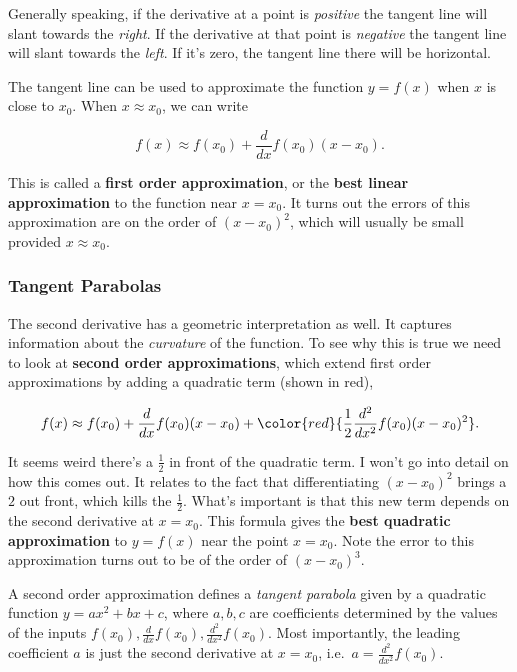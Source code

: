 \documentclass[
  letterpaper,
  DIV=11,
  numbers=noendperiod]{scrreprt}
\begin{document}
Generally speaking, if the derivative at a point is \emph{positive} the
tangent line will slant towards the \emph{right}. If the derivative at
that point is \emph{negative} the tangent line will slant towards the
\emph{left}. If it's zero, the tangent line there will be horizontal.

The tangent line can be used to approximate the function \(y=f(x)\) when
\(x\) is close to \(x_0\). When \(x \approx x_0\), we can write

\[f(x) \approx f(x_0) + \frac{d}{dx}f(x_0)(x - x_0).\]

This is called a \textbf{first order approximation}, or the \textbf{best
linear approximation} to the function near \(x=x_0\). It turns out the
errors of this approximation are on the order of \((x-x_0)^2\), which
will usually be small provided \(x \approx x_0\).

\hypertarget{tangent-parabolas}{%
\subsubsection{Tangent Parabolas}\label{tangent-parabolas}}

The second derivative has a geometric interpretation as well. It
captures information about the \emph{curvature} of the function. To see
why this is true we need to look at \textbf{second order
approximations}, which extend first order approximations by adding a
quadratic term (shown in red),

\[f(x) \approx f(x_0) + \frac{d}{dx}f(x_0) (x-x_0) + \color{red}{\frac{1}{2}\frac{d^2}{dx^2}f(x_0) (x-x_0)^2}.\]

It seems weird there's a \(\frac{1}{2}\) in front of the quadratic term.
I won't go into detail on how this comes out. It relates to the fact
that differentiating \((x-x_0)^2\) brings a \(2\) out front, which kills
the \(\frac{1}{2}\). What's important is that this new term depends on
the second derivative at \(x=x_0\). This formula gives the \textbf{best
quadratic approximation} to \(y=f(x)\) near the point \(x=x_0\). Note
the error to this approximation turns out to be of the order of
\((x-x_0)^3\).

A second order approximation defines a \emph{tangent parabola} given by
a quadratic function \(y=ax^2+bx+c\), where \(a,b,c\) are coefficients
determined by the values of the inputs
\(f(x_0), \frac{d}{dx}f(x_0), \frac{d^2}{dx^2}f(x_0)\). Most
importantly, the leading coefficient \(a\) is just the second derivative
at \(x=x_0\), i.e.~\(a = \frac{d^2}{dx^2}f(x_0)\).
\end{document}
